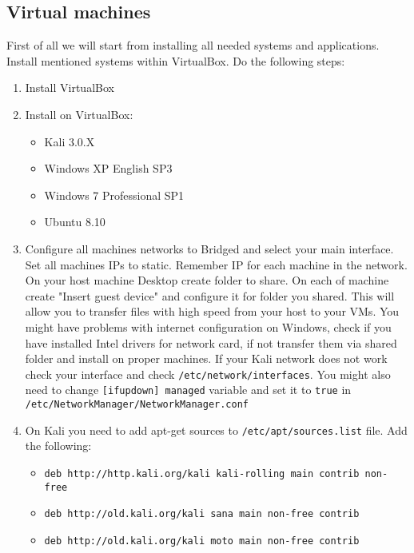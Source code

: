 \subsection{Virtual machines}
First of all we will start from installing all needed systems and applications.
Install mentioned systems within VirtualBox.
Do the following steps:
\begin{enumerate}
    \item{Install VirtualBox}
    \item{Install on VirtualBox:}
    \begin{itemize}
        \item{Kali 3.0.X}
        \item{Windows XP English SP3}
        \item{Windows 7 Professional SP1}
        \item{Ubuntu 8.10}
    \end{itemize}
    \item{Configure all machines networks to Bridged and select your main interface. Set all machines IPs to static. Remember IP for each machine in the network.
    On your host machine Desktop create folder to share. On each of machine create "Insert guest device" and configure it for folder you shared. This will allow you to transfer files with high speed from your host
    to your VMs. You might have problems with internet configuration on Windows, check if you have installed Intel drivers for network card, if not transfer them via shared folder and install on proper machines. If your Kali network does not work check your interface and check
    \texttt{/etc/network/interfaces}. You might also need to change \texttt{[ifupdown] managed} variable and set it to \texttt{true} in \texttt{/etc/NetworkManager/NetworkManager.conf}}

    \item{On Kali you need to add apt-get sources to \texttt{/etc/apt/sources.list} file. Add the following:

    \begin{itemize}
        \item{\texttt{deb http://http.kali.org/kali kali-rolling main contrib non-free}}
        \item{\texttt{deb http://old.kali.org/kali sana main non-free contrib}}
        \item{\texttt{deb http://old.kali.org/kali moto main non-free contrib}}
    \end{itemize}

}
\end{enumerate}
